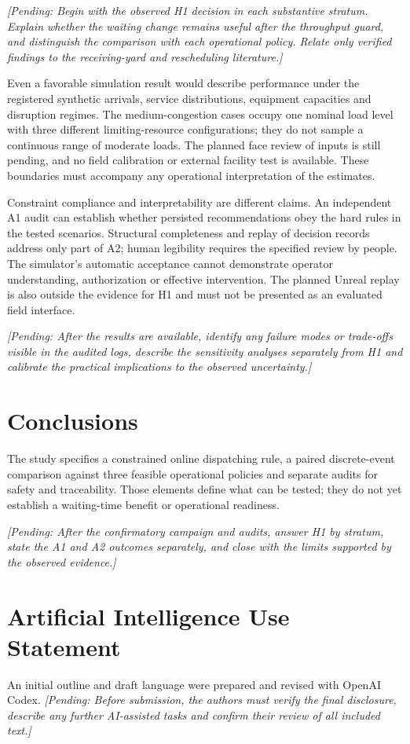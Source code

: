 \documentclass[12pt,a4paper]{article}
\newcommand{\pending}[1]{\textcolor{black!70}{\emph{[Pending: #1]}}}
\begin{document}
\pending{Begin with the observed H1 decision in each substantive stratum. Explain whether the waiting change remains useful after the throughput guard, and distinguish the comparison with each operational policy. Relate only verified findings to the receiving-yard and rescheduling literature.}

Even a favorable simulation result would describe performance under the registered synthetic arrivals, service distributions, equipment capacities and disruption regimes. The medium-congestion cases occupy one nominal load level with three different limiting-resource configurations; they do not sample a continuous range of moderate loads. The planned face review of inputs is still pending, and no field calibration or external facility test is available. These boundaries must accompany any operational interpretation of the estimates.

Constraint compliance and interpretability are different claims. An independent A1 audit can establish whether persisted recommendations obey the hard rules in the tested scenarios. Structural completeness and replay of decision records address only part of A2; human legibility requires the specified review by people. The simulator's automatic acceptance cannot demonstrate operator understanding, authorization or effective intervention. The planned Unreal replay is also outside the evidence for H1 and must not be presented as an evaluated field interface.

\pending{After the results are available, identify any failure modes or trade-offs visible in the audited logs, describe the sensitivity analyses separately from H1 and calibrate the practical implications to the observed uncertainty.}

\section{Conclusions}

The study specifies a constrained online dispatching rule, a paired discrete-event comparison against three feasible operational policies and separate audits for safety and traceability. Those elements define what can be tested; they do not yet establish a waiting-time benefit or operational readiness.

\pending{After the confirmatory campaign and audits, answer H1 by stratum, state the A1 and A2 outcomes separately, and close with the limits supported by the observed evidence.}

\section*{Artificial Intelligence Use Statement}

An initial outline and draft language were prepared and revised with OpenAI Codex. \pending{Before submission, the authors must verify the final disclosure, describe any further AI-assisted tasks and confirm their review of all included text.}

\printbibliography[title={References}]
\end{document}
